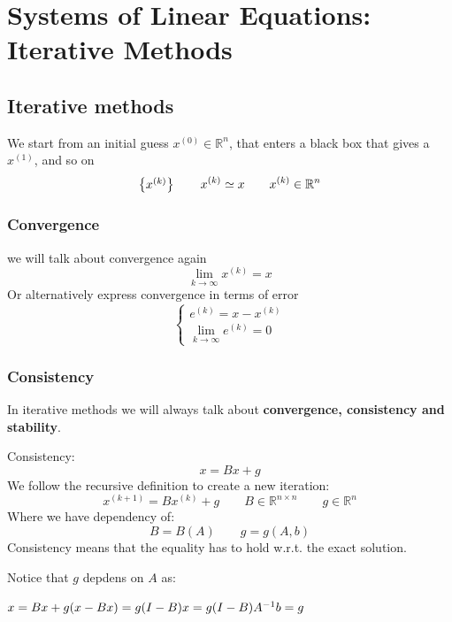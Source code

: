 
\section{Systems of Linear Equations: Iterative Methods}

\subsection{Iterative methods}
    We start from an initial guess $x^{(0)}\in\mathbb{R}^n$, that enters a black box that gives a $x^{(1)}$, and so on
    $$
    \begin{Bmatrix} {x^{(k)}} \end{Bmatrix}\qquad x^{(k)}\simeq x\qquad x^{(k)}\in\mathbb{R}^n
    $$

    \subsubsection{Convergence}
    we will talk about convergence again
    $$
    \lim_{k\rightarrow\infty}x^{(k)}=x
    $$
    Or alternatively express convergence in terms of error
    $$
    \begin{cases}
        e^{(k)}=x-x^{(k)}\\
        \lim_{k\rightarrow\infty}e^{(k)}=0
    \end{cases}
    $$
    \subsubsection{Consistency}
    In iterative methods we will always talk about \textbf{convergence, consistency and stability}.

    Consistency:
    $$
    x=Bx+g
    $$
    We follow the recursive definition to create a new iteration:
    $$
    x^{(k+1)}=Bx^{(k)}+g\qquad B\in\mathbb{R}^{n\times n}\qquad g\in\mathbb{R}^n
    $$
    Where we have dependency of:
    $$
    B=B(A)\qquad g=g(A,b)
    $$
    Consistency means that the equality has to hold w.r.t. the exact solution.

    Notice that $g$ depdens on $A$ as:
    \vspace{1em}

    $
    x=Bx+g\\
    (x-Bx)=g\\
    (I-B)x=g\\
    (I-B)A^{-1}b=g
    $

